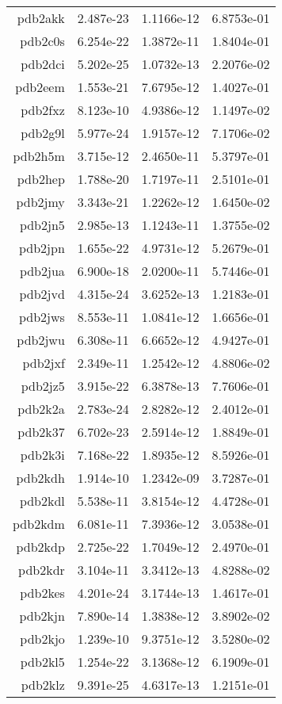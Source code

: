 \begin{xltabular}{\textwidth}{||rS[table-format=1.3e+2]S[table-format=1.4e+2]S[table-format=1.4e+2]||}
pdb2akk & 2.487e-23 & 1.1166e-12 & 6.8753e-01 \\
pdb2c0s & 6.254e-22 & 1.3872e-11 & 1.8404e-01 \\
pdb2dci & 5.202e-25 & 1.0732e-13 & 2.2076e-02 \\
pdb2eem & 1.553e-21 & 7.6795e-12 & 1.4027e-01 \\
pdb2fxz & 8.123e-10 & 4.9386e-12 & 1.1497e-02 \\
pdb2g9l & 5.977e-24 & 1.9157e-12 & 7.1706e-02 \\
pdb2h5m & 3.715e-12 & 2.4650e-11 & 5.3797e-01 \\
pdb2hep & 1.788e-20 & 1.7197e-11 & 2.5101e-01 \\
pdb2jmy & 3.343e-21 & 1.2262e-12 & 1.6450e-02 \\
pdb2jn5 & 2.985e-13 & 1.1243e-11 & 1.3755e-02 \\
pdb2jpn & 1.655e-22 & 4.9731e-12 & 5.2679e-01 \\
pdb2jua & 6.900e-18 & 2.0200e-11 & 5.7446e-01 \\
pdb2jvd & 4.315e-24 & 3.6252e-13 & 1.2183e-01 \\
pdb2jws & 8.553e-11 & 1.0841e-12 & 1.6656e-01 \\
pdb2jwu & 6.308e-11 & 6.6652e-12 & 4.9427e-01 \\
pdb2jxf & 2.349e-11 & 1.2542e-12 & 4.8806e-02 \\
pdb2jz5 & 3.915e-22 & 6.3878e-13 & 7.7606e-01 \\
pdb2k2a & 2.783e-24 & 2.8282e-12 & 2.4012e-01 \\
pdb2k37 & 6.702e-23 & 2.5914e-12 & 1.8849e-01 \\
pdb2k3i & 7.168e-22 & 1.8935e-12 & 8.5926e-01 \\
pdb2kdh & 1.914e-10 & 1.2342e-09 & 3.7287e-01 \\
pdb2kdl & 5.538e-11 & 3.8154e-12 & 4.4728e-01 \\
pdb2kdm & 6.081e-11 & 7.3936e-12 & 3.0538e-01 \\
pdb2kdp & 2.725e-22 & 1.7049e-12 & 2.4970e-01 \\
pdb2kdr & 3.104e-11 & 3.3412e-13 & 4.8288e-02 \\
pdb2kes & 4.201e-24 & 3.1744e-13 & 1.4617e-01 \\
pdb2kjn & 7.890e-14 & 1.3838e-12 & 3.8902e-02 \\
pdb2kjo & 1.239e-10 & 9.3751e-12 & 3.5280e-02 \\
pdb2kl5 & 1.254e-22 & 3.1368e-12 & 6.1909e-01 \\
pdb2klz & 9.391e-25 & 4.6317e-13 & 1.2151e-01 \\

\end{xltabular}
